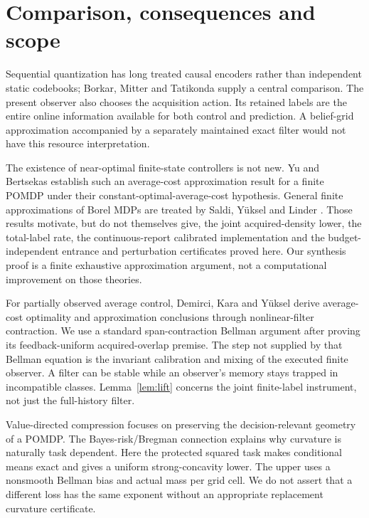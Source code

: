 \section{Comparison, consequences and scope}\label{sec:comparison}
Sequential quantization has long treated causal encoders rather than independent static codebooks; Borkar, Mitter and Tatikonda \cite{BMT2001} supply a central comparison. The present observer also chooses the acquisition action. Its retained labels are the entire online information available for both control and prediction. A belief-grid approximation accompanied by a separately maintained exact filter would not have this resource interpretation.

The existence of near-optimal finite-state controllers is not new. Yu and Bertsekas \cite{YuBertsekas2008} establish such an average-cost approximation result for a finite POMDP under their constant-optimal-average-cost hypothesis. General finite approximations of Borel MDPs are treated by Saldi, Y\"uksel and Linder \cite{SYL2016}. Those results motivate, but do not themselves give, the joint acquired-density lower, the total-label rate, the continuous-report calibrated implementation and the budget-independent entrance and perturbation certificates proved here. Our synthesis proof is a finite exhaustive approximation argument, not a computational improvement on those theories.

For partially observed average control, Demirci, Kara and Y\"uksel \cite{DKY2024} derive average-cost optimality and approximation conclusions through nonlinear-filter contraction. We use a standard span-contraction Bellman argument after proving its feedback-uniform acquired-overlap premise. The step not supplied by that Bellman equation is the invariant calibration and mixing of the executed finite observer. A filter can be stable while an observer's memory stays trapped in incompatible classes. Lemma~\ref{lem:lift} concerns the joint finite-label instrument, not just the full-history filter.

Value-directed compression \cite{PB2002} focuses on preserving the decision-relevant geometry of a POMDP. The Bayes-risk/Bregman connection \cite{Varshney2011} explains why curvature is naturally task dependent. Here the protected squared task makes conditional means exact and gives a uniform strong-concavity lower. The upper uses a nonsmooth Bellman bias and actual mass per grid cell. We do not assert that a different loss has the same exponent without an appropriate replacement curvature certificate.

